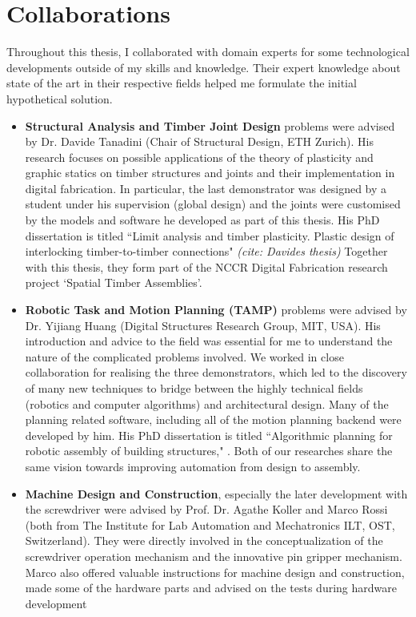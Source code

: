 \section{Collaborations}
\label{section:methodology-collaborations}

Throughout this thesis, I collaborated with domain experts for some technological developments outside of my skills and knowledge. Their expert knowledge about state of the art in their respective fields helped me formulate the initial hypothetical solution. 

\begin{itemize}
	\item \textbf{Structural Analysis and Timber Joint Design }problems were advised by Dr. Davide Tanadini (Chair of Structural Design, ETH Zurich). His research focuses on possible applications of the theory of plasticity and graphic statics on timber structures and joints and their implementation in digital fabrication. In particular, the last demonstrator was designed by a student under his supervision (global design) and the joints were customised by the models and software he developed as part of this thesis. His PhD dissertation is titled ``Limit analysis and timber plasticity. Plastic design of interlocking timber-to-timber connections" \textit{(cite: Davides thesis) }Together with this thesis, they form part of the NCCR Digital Fabrication research project ‘Spatial Timber Assemblies’.

	\item \textbf{Robotic Task and Motion Planning (TAMP) }problems were advised by Dr. Yijiang Huang (Digital Structures Research Group, MIT, USA). His introduction and advice to the field was essential for me to understand the nature of the complicated problems involved. We worked in close collaboration for realising the three demonstrators, which led to the discovery of many new techniques to bridge between the highly technical fields (robotics and computer algorithms) and architectural design. Many of the planning related software, including all of the motion planning backend were developed by him. His PhD dissertation is titled ``Algorithmic planning for robotic assembly of building structures," \parencite{huangAlgorithmicPlanningRobotic2022}. Both of our researches share the same vision towards improving automation from design to assembly. 

	\item \textbf{Machine Design and Construction}, especially the later development with the screwdriver were advised by Prof. Dr. Agathe Koller and Marco Rossi (both from The Institute for Lab Automation and Mechatronics ILT, OST, Switzerland). They were directly involved in the conceptualization of the screwdriver operation mechanism and the innovative pin gripper mechanism. Marco also offered valuable instructions for machine design and construction, made some of the hardware parts and advised on the tests during hardware development

\end{itemize}
